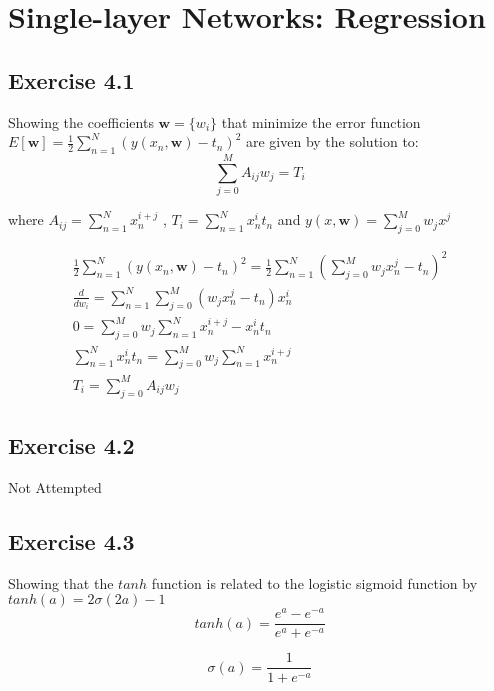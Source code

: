 \section{Single-layer Networks: Regression}

\subsection{Exercise 4.1}
Showing the coefficients $\mathbf{w} = \{w_i\}$ that minimize the error function $E[\mathbf{w}] = \frac{1}{2} \sum_{n=1}^{N} (y(x_n,\mathbf{w}) - t_n)^2 $ are given by the solution to:
\begin{equation}
  \sum_{j=0}^{M}A_{ij}w_j = T_i
\end{equation}

where $A_{ij} = \sum_{n=1}^{N}x_n^{i+j}$ , $T_i = \sum_{n=1}^{N}x_n^it_n$ and $y(x,\mathbf{w}) = \sum_{j=0}^{M} w_j x^j$

\begin{gather}
  \frac{1}{2} \sum_{n=1}^{N} (y(x_n,\mathbf{w}) - t_n)^2 =  \frac{1}{2} \sum_{n=1}^{N} (\sum_{j=0}^{M} w_j x_n^j - t_n)^2 \\
  \frac{d}{dw_i} = \sum_{n=1}^{N} \sum_{j=0}^{M}( w_j x_n^j - t_n)x_n^i \\
  0 =  \sum_{j=0}^{M} w_j \sum_{n=1}^{N} x_n^{i+j} - x_n^it_n \\
  \sum_{n=1}^{N}x_n^it_n = \sum_{j=0}^{M} w_j \sum_{n=1}^{N} x_n^{i+j} \\
  T_i = \sum_{j=0}^{M}A_{ij}w_j
\end{gather}

\subsection{Exercise 4.2}
Not Attempted



\subsection{Exercise 4.3}
Showing that the $tanh$ function is related to the logistic sigmoid function by $tanh(a) = 2\sigma(2a) -1$
\begin{equation}
  tanh(a) = \frac{e^a-e^{-a}}{e^a+e^{-a}}
\end{equation}

\begin{equation}
  \sigma(a) = \frac{1}{1+e^{-a}}
\end{equation}

